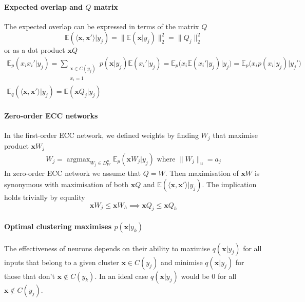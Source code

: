\documentclass[12pt]{article}
\DeclareMathOperator*{\argmax}{argmax}
\begin{document}
\paragraph{Expected overlap and $Q$ matrix} 
The expected overlap can be expressed in terms of the matrix $Q$
\[
\mathbb{E}(\langle \boldsymbol{x}, \boldsymbol{x}'\rangle|y_j) = \lVert \mathbb{E}(\boldsymbol{x}|y_j) \rVert_2^2 =  \lVert Q_j \rVert_2^2
\]
or as a dot product $\boldsymbol{x}Q$
\begin{gather*}
	\mathbb{E}_p(x_i x_i' | y_j) = 
	\sum_{\substack{\boldsymbol{x}\in C(y_j) \\ x_i=1}} p(\boldsymbol{x}|y_j) \mathbb{E}(x_i'|y_j)= \mathbb{E}_p\big(x_i \mathbb{E}(x_i'|y_j) \big| y_j\big) = \mathbb{E}_p\big(x_i p(x_i|y_j) \big| y_j'\big)\\
	\mathbb{E}_q(\langle \boldsymbol{x}, \boldsymbol{x}'\rangle|y_j) = \mathbb{E}(\boldsymbol{x} Q_j | y_j)
\end{gather*}

\paragraph{Zero-order ECC networks}
In the first-order ECC network, we defined weights by finding $W_j$ that maximise product $\boldsymbol{x}W_j$
\begin{gather*}
	W_j = \argmax_{W_j\in D_W^{n}} \mathbb{E}_p(\boldsymbol{x}W_j|y_j)\text{ where } \lVert W_j \rVert_u=a_j
\end{gather*}
In zero-order ECC network we assume that $Q=W$. Then maximisation of $\boldsymbol{x}W$ is synonymous with maximisation of both $\boldsymbol{x}Q$ and $\mathbb{E}(\langle \boldsymbol{x}, \boldsymbol{x}'\rangle|y_j) $. 
The implication holds trivially by equality
\[
\boldsymbol{x}W_j \le \boldsymbol{x}W_h  \implies  \boldsymbol{x}Q_j \le \boldsymbol{x}Q_h 
\]
\paragraph{Optimal clustering maximises $p(\boldsymbol{x}|y_k)$} 
The effectiveness of neurons depends on their ability to maximise $q(\boldsymbol{x}|y_j)$ for all inputs that belong to a given cluster $\boldsymbol{x}\in C(y_j)$ and minimise $q(\boldsymbol{x}|y_j)$ for those that don't  $\boldsymbol{x}\notin C(y_k)$. In an ideal case $q(\boldsymbol{x}|y_j)$ would be $0$ for all $\boldsymbol{x}\notin C(y_j)$. 
\end{document}
